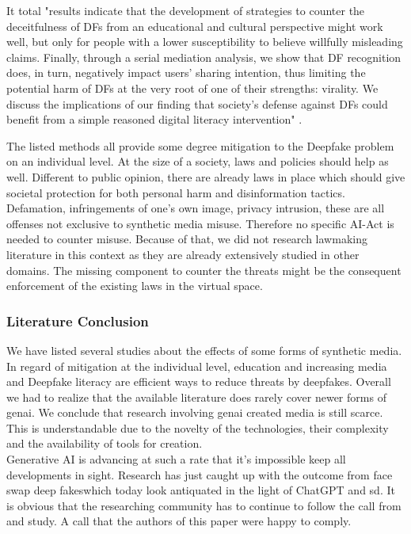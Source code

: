 \documentclass[
  a4paper,  %
  twoside,  %
  bibliography=totoc,
  headsepline,
  cleardoublepage=empty,
  parskip=half,
  draft=false
]{scrbook}
\begin{document}
It total "results indicate that the development of strategies to counter the deceitfulness of DFs from an educational and cultural perspective might work well, but only for people with a lower susceptibility to believe willfully misleading claims. Finally, through a serial mediation analysis, we show that DF recognition does, in turn, negatively impact users' sharing intention, thus limiting the potential harm of DFs at the very root of one of their strengths: virality. We discuss the implications of our finding that society's defense against DFs could benefit from a simple reasoned digital literacy intervention" \cite{iacobucciDeepfakesUnmaskedEffects2021}.

The listed methods all provide some degree mitigation to the Deepfake problem on an individual level. At the size of a society, laws and policies should help as well. Different to public opinion, there are already laws in place which should give societal protection for both personal harm and disinformation tactics. Defamation, infringements of one's own image, privacy intrusion, these are all offenses not exclusive to synthetic media misuse. Therefore no specific AI-Act is needed to counter misuse. Because of that, we did not research lawmaking literature in this context as they are already extensively studied in other domains. The missing component to counter the threats might be the consequent enforcement of the existing laws in the virtual space. 

\subsubsection*{Literature Conclusion}
We have listed several studies about the effects of some forms of synthetic media. In regard of mitigation at the individual level, education and increasing media and Deepfake literacy are efficient ways to reduce threats by deepfakes. Overall we had to realize that the available literature does rarely cover newer forms of \gls{genai}.
We conclude that research involving \gls{genai} created media is still scarce. This is understandable due to the novelty of the technologies, their complexity and the availability of tools for creation. \\
Generative AI is advancing at such a rate that it's impossible keep all developments in sight. Research has just caught up with the outcome from face swap deep fakeswhich today look antiquated in the light of ChatGPT and \gls{sd}. 
It is obvious that the researching community has to continue to follow the call from \citet{hancockSocialImpactDeepfakes2021} and study. A call that the authors of this paper were happy to comply.
\end{document}

